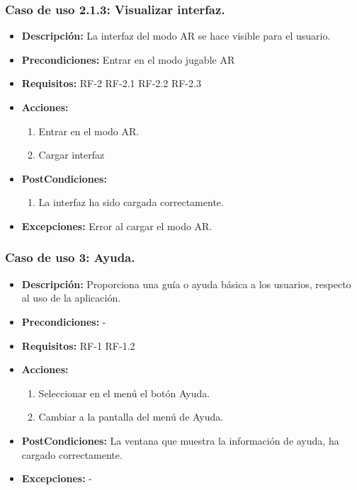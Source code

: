 \subsubsection{Caso de uso  2.1.3: Visualizar interfaz.}
\begin{itemize}
	\item \textbf{Descripción:} La interfaz del modo AR se hace visible para el usuario.
	\item \textbf{Precondiciones:} Entrar en el modo jugable AR
	\item \textbf{Requisitos:} RF-2 RF-2.1 RF-2.2 RF-2.3
	\item \textbf{Acciones:}
		\begin{enumerate}
			\item Entrar en el modo AR.
			\item Cargar interfaz
		\end{enumerate}
	\item \textbf{PostCondiciones:}
		\begin{enumerate}
			\item La interfaz ha sido cargada correctamente.
		\end{enumerate}
	\item \textbf{Excepciones:} Error al cargar el modo AR.
\end{itemize}
\subsubsection{Caso de uso 3: Ayuda.}
\begin{itemize}
	\item \textbf{Descripción:} Proporciona una guía o ayuda básica a los usuarios, respecto al uso de la aplicación.
	\item \textbf{Precondiciones:} -
	\item \textbf{Requisitos:} RF-1 RF-1.2
	\item \textbf{Acciones:}
	\begin{enumerate}
		\item Seleccionar en el menú el botón Ayuda.
		\item Cambiar a la pantalla del menú de Ayuda.
	\end{enumerate}
	\item \textbf{PostCondiciones:} La ventana que muestra la información de ayuda, ha cargado correctamente.
	\item \textbf{Excepciones:} -
\end{itemize}
